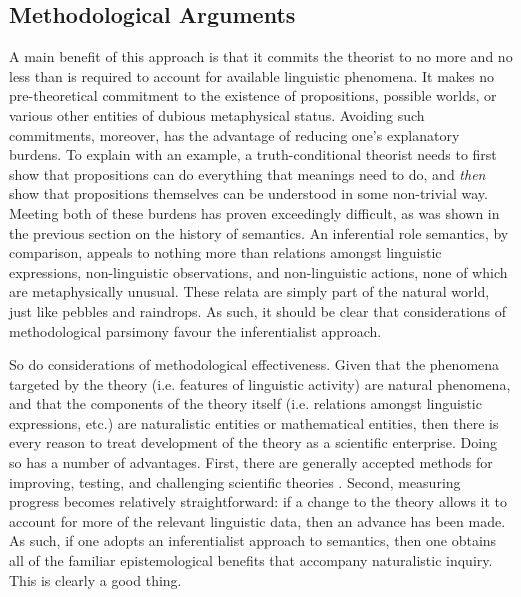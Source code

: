 \subsection{Methodological Arguments}

A main benefit of this approach is that it commits the theorist to no more and no less than is required to account for available linguistic phenomena. It makes no pre-theoretical commitment to the existence of propositions, possible worlds, or various other entities of dubious metaphysical status. Avoiding such commitments, moreover, has the advantage of reducing one's explanatory burdens. To explain with an example, a truth-conditional theorist needs to first show that propositions can do everything that meanings need to do, and \textit{then} show that propositions themselves can be understood in some non-trivial way. Meeting both of these burdens has proven exceedingly difficult, as was shown in the previous section on the history of semantics. An inferential role semantics, by comparison, appeals to nothing more than relations amongst linguistic expressions, non-linguistic observations, and non-linguistic actions, none of which are metaphysically unusual. These relata are simply part of the natural world, just like pebbles and raindrops. As such, it should be clear that considerations of methodological parsimony favour the inferentialist approach. 

So do considerations of methodological effectiveness. Given that the phenomena targeted by the theory (i.e. features of linguistic activity) are natural phenomena, and that the components of the theory itself (i.e. relations amongst linguistic expressions, etc.) are naturalistic entities or mathematical entities, then there is every reason to treat development of the theory as a scientific enterprise. Doing so has a number of advantages. First, there are generally accepted methods for improving, testing, and challenging scientific theories \citep{GodfreySmith:2002}. Second, measuring progress becomes relatively straightforward: if a change to the theory allows it to account for more of the relevant linguistic data, then an advance has been made. As such, if one adopts an inferentialist approach to semantics, then one obtains all of the familiar epistemological benefits that accompany naturalistic inquiry. This is clearly a good thing.

